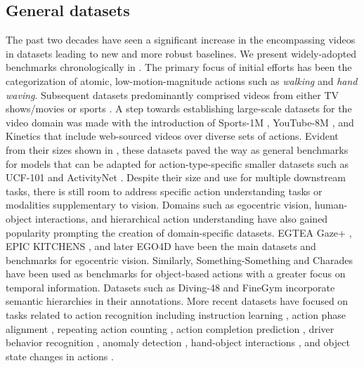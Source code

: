 \subsection{General datasets}
\label{sec:datasets::general}
The past two decades have seen a significant increase in the encompassing videos in datasets leading to new and more robust baselines. We present widely-adopted benchmarks chronologically in . The primary focus of initial efforts \citep{schuldt2004recognizing,gorelick2007actions} has been the categorization of atomic, low-motion-magnitude actions such as \emph{walking} and \emph{hand waving}. Subsequent datasets predominantly comprised videos from either TV shows/movies \citep{laptev2007retrieving,laptev2008learning,marszalek2009actions,patron2010high,kuehne2011hmdb} or sports \citep{rodriguez2008action,liu2009recognizing,reddy2013recognizing,niebles2010modeling}. A step towards establishing large-scale datasets for the video domain was made with the introduction of Sports-1M \citep{karpathy2014large}, YouTube-8M \citep{abu2016youtube}, and Kinetics \citep{carreira2017quo} that include web-sourced videos over diverse sets of actions. Evident from their sizes shown in , these datasets paved the way as general benchmarks for models that can be adapted for action-type-specific smaller datasets such as UCF-101 \citep{soomro2012ucf101} and ActivityNet \citep{caba2015activitynet}. Despite their size and use for multiple downstream tasks, there is still room to address specific action understanding tasks or modalities supplementary to vision.  Domains such as 
egocentric vision, human-object interactions, and hierarchical action understanding have also gained popularity prompting the creation of domain-specific datasets. EGTEA Gaze+ \citep{li2015delving}, EPIC KITCHENS \citep{damen2022rescaling}, and later EGO4D \citep{grauman2022ego4d} have been the main datasets and benchmarks for egocentric vision. Similarly, Something-Something \citep{goyal2017something} and Charades \citep{sigurdsson2016hollywood} have been used as benchmarks for object-based actions with a greater focus on temporal information. Datasets such as Diving-48 \citep{li2018resound} and FineGym \citep{shao2020finegym} incorporate semantic hierarchies in their annotations. More recent datasets have focused on tasks related to action recognition including instruction learning \citep{alayrac2016unsupervised,bansal2022my,ben2021ikea,ohkawa2023assemblyhands,sener2022assembly101,tang2019coin}, action phase alignment \citep{sermanet2017unsupervised}, repeating action counting \citep{dwibedi2020counting,dwibedi2024ovr,hu2022transrac,runia2018real,zhang2020context}, action completion prediction \citep{epstein2020oops}, driver behavior recognition \citep{martin2019drive,ortega2020dmd}, anomaly detection \citep{acsintoae2022ubnormal,liu2018future,lu2013abnormal,sultani2018real,wu2020not}, hand-object interactions \citep{chao2021dexycb,garcia2018first,hampali2020honnotate,kwon2021h2o,moon2020interhand2,mueller2017real}, and object state changes in actions \citep{souvcek2022look}. 



